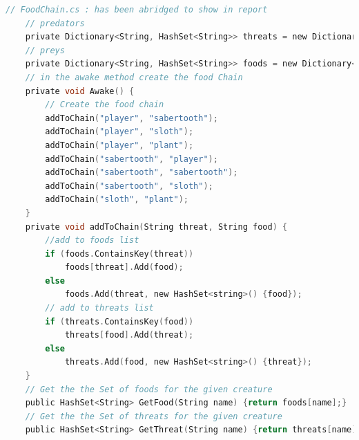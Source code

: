 \documentclass[11pt]{report}
\begin{document}
\begin{lstlisting}[language=c]
// FoodChain.cs : has been abridged to show in report
    // predators
    private Dictionary<String, HashSet<String>> threats = new Dictionary<string, HashSet<string>>();
    // preys
    private Dictionary<String, HashSet<String>> foods = new Dictionary<string, HashSet<string>>();
    // in the awake method create the food Chain
    private void Awake() {
        // Create the food chain
        addToChain("player", "sabertooth");
        addToChain("player", "sloth");
        addToChain("player", "plant");
        addToChain("sabertooth", "player");
        addToChain("sabertooth", "sabertooth");
        addToChain("sabertooth", "sloth");
        addToChain("sloth", "plant");
    }
    private void addToChain(String threat, String food) {
        //add to foods list
        if (foods.ContainsKey(threat)) 
            foods[threat].Add(food);
        else 
            foods.Add(threat, new HashSet<string>() {food});
        // add to threats list
        if (threats.ContainsKey(food)) 
            threats[food].Add(threat);
        else
            threats.Add(food, new HashSet<string>() {threat});
    }
    // Get the the Set of foods for the given creature
    public HashSet<String> GetFood(String name) {return foods[name];}
    // Get the the Set of threats for the given creature
    public HashSet<String> GetThreat(String name) {return threats[name];}
\end{lstlisting}
\end{document}
